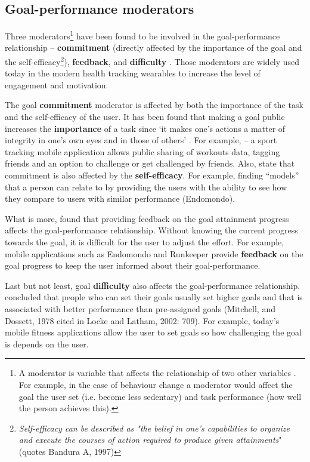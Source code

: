     \subsection{Goal-performance moderators}
    \label{subsection:goal-moderators}
    Three moderators\footnote{A moderator is variable that affects the relationship of two other variables \citep{moderatormediator}. For example, in the case of behaviour change a moderator would affect the goal the user set (i.e. become less sedentary) and task performance (how well the person achieves this).} have been found to be involved in the goal-performance relationship – \textbf{commitment} (directly affected by the importance of the goal and the self-efficacy\footnote{\textit{Self-efficacy can be described as "the belief in one’s capabilities to organize and execute the courses of action required to produce given attainments}" \citep[308]{williams2011} (quotes Bandura A, 1997)}), \textbf{feedback}, and \textbf{difficulty} \citep[707]{locke2002}. Those moderators are widely used today in the modern health tracking wearables to increase the level of engagement and motivation.
    
    The goal \textbf{commitment} moderator is affected by both the importance of the task and the self-efficacy of the user. It has been found that making a goal public increases the \textbf{importance} of a task since ‘it makes one’s actions a matter of integrity in one’s own eyes and in those of others’ \citep[707]{locke2002}. For example, \citet[]{endomondo2017} – a sport tracking mobile application allows public sharing of workouts data, tagging friends and an option to challenge or get challenged by friends. Also, \citet[708]{locke2002} state that commitment is also affected by the \textbf{self-efficacy}. For example, finding “models” that a person can relate to by providing the users with the ability to see how they compare to users with similar performance (Endomondo).
    
    What is more, \citet[708]{locke2002} found that providing feedback on the goal attainment progress affects the goal-performance relationship. Without knowing the current progress towards the goal, it is difficult for the user to adjust the effort. For example, mobile applications such as Endomondo and Runkeeper \citep{fitnesskeeper2017} provide \textbf{feedback} on the goal progress to keep the user informed about their goal-performance.
    
    Last but not least, goal \textbf{difficulty} also affects the goal-performance relationship. \citet[709]{locke2002} concluded that people who can set their goals usually set higher goals and that is associated with better performance than pre-assigned goals (Mitchell, and Dossett, 1978 cited in Locke and Latham, 2002: 709). For example, today’s mobile fitness applications allow the user to set goals \citep{fitnesskeeper2017,endomondo2017} so how challenging the goal is depends on the user.
    
